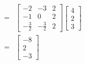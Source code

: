 \documentclass[12pt]{article}
\begin{document}
\begin{align}
    =&\left[\begin{matrix}-2 & -3 & 2\\-1 & 0 & 2\\- \frac{3}{2} & - \frac{3}{2} & 2\end{matrix}\right]	\left[\begin{matrix}4\\2\\3\end{matrix}\right] \\
    =&\left[\begin{matrix}-8\\2\\-3\end{matrix}\right]
\end{align}



\end{document}
